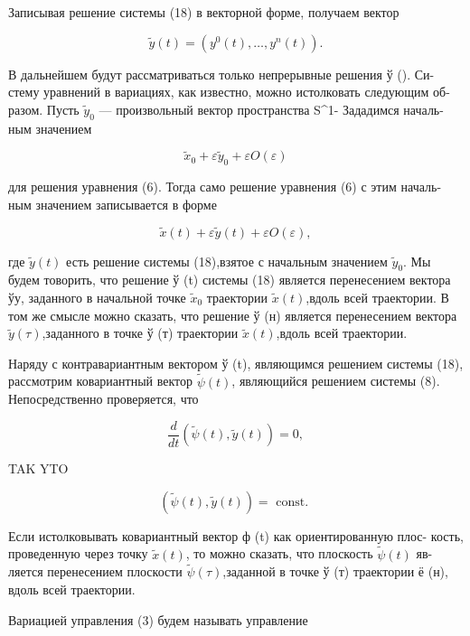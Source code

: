 \documentclass[10pt]{article}
\begin{document}
Записывая решение системы (18) в векторной форме, получаем вектор

\[
\widetilde{y}\left( t\right)  = \left( {{y}^{0}\left( t\right),\ldots,{y}^{n}\left( t\right) }\right).
\]

В дальнейшем будут рассматриваться только непрерывные решения ў (). Си- стему уравнений в вариациях, как известно, можно истолковать следующим об- разом. Пусть \({\widetilde{y}}_{0}\) — произвольный вектор пространства S\textasciicircum 1- Зададимся началь- ным значением

\[
{\widetilde{x}}_{0} + \varepsilon {\widetilde{y}}_{0} + {\varepsilon O}\left( \varepsilon \right)
\]

для решения уравнения (6). Тогда само решение уравнения (6) с этим началь- ным значением записывается в форме

\[
\widetilde{x}\left( t\right)  + \varepsilon \widetilde{y}\left( t\right)  + {\varepsilon O}\left( \varepsilon \right), \tag{19}
\]

где \(\widetilde{y}\left( t\right)\) есть решение системы (18),взятое с начальным значением \({\widetilde{y}}_{0}\). Мы будем товорить, что решение ў (t) системы (18) является перенесением вектора ўу, заданного в начальной точке \({\widetilde{x}}_{0}\) траектории \(\widetilde{x}\left( t\right)\),вдоль всей траектории. В том же смысле можно сказать, что решение ў (н) является перенесением вектора \(\widetilde{y}\left( \tau \right)\),заданного в точке ў (т) траектории \(\widetilde{x}\left( t\right)\),вдоль всей траектории.

Наряду с контравариантным вектором ў (t), являющимся решением системы (18), рассмотрим ковариантный вектор \(\widetilde{\psi }\left( t\right)\), являющийся решением системы (8). Непосредственно проверяется, что

\[
\frac{d}{dt}\left( {\widetilde{\psi }\left( t\right),\widetilde{y}\left( t\right) }\right)  = 0,
\]

TAK YTO

\[
\left( {\widetilde{\psi }\left( t\right),\widetilde{y}\left( t\right) }\right)  = \text{ const. }
\]

Если истолковывать ковариантный вектор ф (t) как ориентированную плос- кость, проведенную через точку \(\widetilde{x}\left( t\right)\), то можно сказать, что плоскость \(\widetilde{\psi }\left( t\right)\) яв- ляется перенесением плоскости \(\widetilde{\psi }\left( \tau \right)\),заданной в точке ў (т) траектории ё (н), вдоль всей траектории.

Вариацией управления (3) будем называть управление
\end{document}
